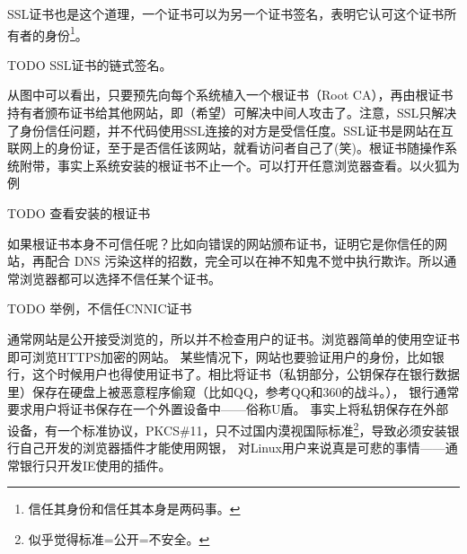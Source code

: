 SSL证书也是这个道理，一个证书可以为另一个证书签名，表明它认可这个证书所有者的身份\footnote{信任其身份和信任其本身是两码事。}。 

TODO SSL证书的链式签名。 %

从图中可以看出，只要预先向每个系统植入一个根证书（Root CA），再由根证书持有者颁布证书给其他网站，即（希望）可解决中间人攻击了。注意，SSL只解决了身份信任问题，并不代码使用SSL连接的对方是受信任度。SSL证书是网站在互联网上的身份证，至于是否信任该网站，就看访问者自己了(笑)。根证书随操作系统附带，事实上系统安装的根证书不止一个。可以打开任意浏览器查看。以火狐为例

TODO 查看安装的根证书 %

如果根证书本身不可信任呢？比如向错误的网站颁布证书，证明它是你信任的网站，再配合 DNS 污染这样的招数，完全可以在神不知鬼不觉中执行欺诈。所以通常浏览器都可以选择不信任某个证书。

TODO 举例，不信任CNNIC证书

通常网站是公开接受浏览的，所以并不检查用户的证书。浏览器简单的使用空证书即可浏览HTTPS加密的网站。
某些情况下，网站也要验证用户的身份，比如银行，这个时候用户也得使用证书了。相比将证书（私钥部分，公钥保存在银行数据里）保存在硬盘上被恶意程序偷窥（比如QQ，参考QQ和360的战斗。），
银行通常要求用户将证书保存在一个外置设备中——俗称U盾。
事实上将私钥保存在外部设备，有一个标准协议，PKCS\#11，只不过国内漠视国际标准\footnote{似乎觉得标准=公开=不安全。}，导致必须安装银行自己开发的浏览器插件才能使用网银，
对Linux用户来说真是可悲的事情——通常银行只开发IE使用的插件。
